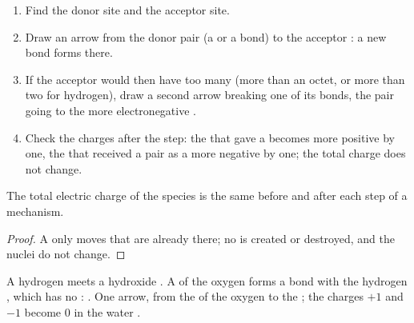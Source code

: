 \begin{method}\label{met:g12:curly-arrows:drawing}
\begin{enumerate}
  \item Find the donor site and the acceptor site.
  \item Draw an arrow from the donor pair (a  or a bond) to the
        acceptor : a new bond forms there.
  \item If the acceptor  would then have too many  (more
        than an octet, or more than two for hydrogen), draw a second arrow
        breaking one of its bonds, the pair going to the more
        electronegative .
  \item Check the charges after the step: the  that gave a 
        becomes more positive by one, the  that received a pair as a
         more negative by one; the total charge does not change.
\end{enumerate}
\end{method}

\begin{proposition}\label{prop:g12:curly-arrows:charge}
The total electric charge of the species is the same before and after
each step of a mechanism.
\end{proposition}

\begin{proof}
A  only moves  that are already there; no 
is created or destroyed, and the nuclei do not change.
\end{proof}

\begin{example}\label{ex:g12:curly-arrows:first}
A hydrogen   meets a hydroxide  . A  of the
oxygen forms a bond with the hydrogen , which has no :
. One arrow, from the  of the oxygen to the
; the charges $+1$ and $-1$ become 0 in the water .
\end{example}


